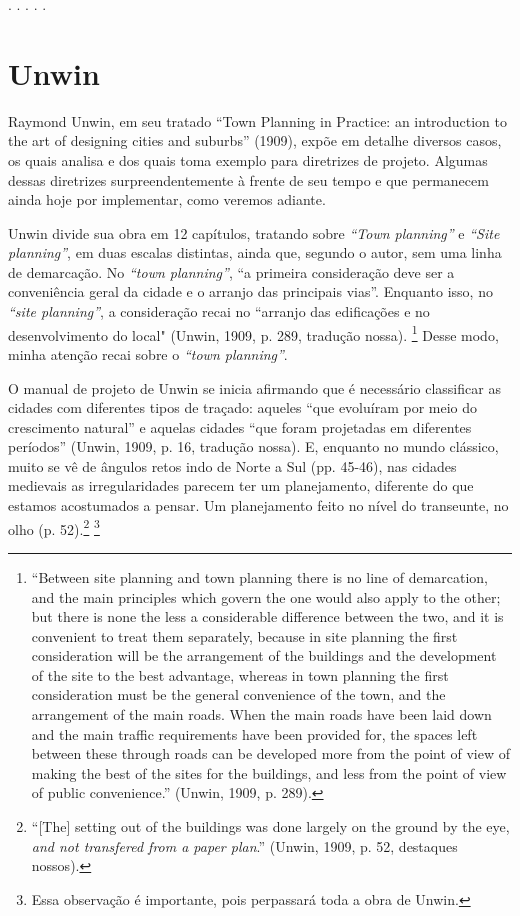 \documentclass[12pt, a4paper]{book} %
\begin{document}
        \begin{center}
            . . . . .
        \end{center} 

\section{Unwin}
        
        Raymond Unwin, em seu tratado ``Town Planning in Practice: an introduction to the art of designing cities and suburbs'' (1909), expõe em detalhe diversos casos, os quais analisa e dos quais toma exemplo para diretrizes de projeto. Algumas dessas diretrizes surpreendentemente à frente de seu tempo e que permanecem ainda hoje por implementar, como veremos adiante. 

        Unwin divide sua obra em 12 capítulos, tratando sobre \textit{``Town planning''} e \textit{``Site planning''}, em duas escalas distintas, ainda que, segundo o autor, sem uma linha de demarcação. No \textit{``town planning''}, ``a primeira consideração deve ser a conveniência geral da cidade e o arranjo das principais vias''. Enquanto isso, no \textit{``site planning''}, a consideração recai no ``arranjo das edificações e no desenvolvimento do local" (Unwin, 1909, p. 289, tradução nossa). 
            \footnote[11]{``Between site planning and town planning there is no line of demarcation, and the main principles which govern the one would also apply to the other; but there is none the less a considerable difference between the two, and it is convenient to treat them separately, because in site planning the first consideration will be the arrangement of the buildings and the development of the site to the best advantage, whereas in town planning the first consideration must be the general convenience of the town, and the arrangement of the main roads. When the main roads have been laid down and the main traffic requirements have been provided for, the spaces left between these through roads can be developed more from the point of view of making the best of the sites for the buildings, and less from the point of view of public convenience.'' (Unwin, 1909, p. 289).} 
        Desse modo, minha atenção recai sobre o \textit{``town planning''}.

        O manual de projeto de Unwin se inicia afirmando que é necessário classificar as cidades com diferentes tipos de traçado: aqueles ``que evoluíram por meio do crescimento natural'' e aquelas cidades ``que foram projetadas em diferentes períodos'' (Unwin, 1909, p. 16, tradução nossa). E, enquanto no mundo clássico, muito se vê de ângulos retos indo de Norte a Sul (pp. 45-46), nas cidades medievais as irregularidades parecem ter um planejamento, diferente do que estamos acostumados a pensar. Um planejamento feito no nível do transeunte, no olho (p. 52).\footnote[12]{``[The] setting out of the buildings was done largely on the ground by the eye, \textit{and not transfered from a paper plan}.'' (Unwin, 1909, p. 52, destaques nossos).}
        \footnote[13]{Essa observação é importante, pois perpassará toda a obra de Unwin.}
\end{document}
